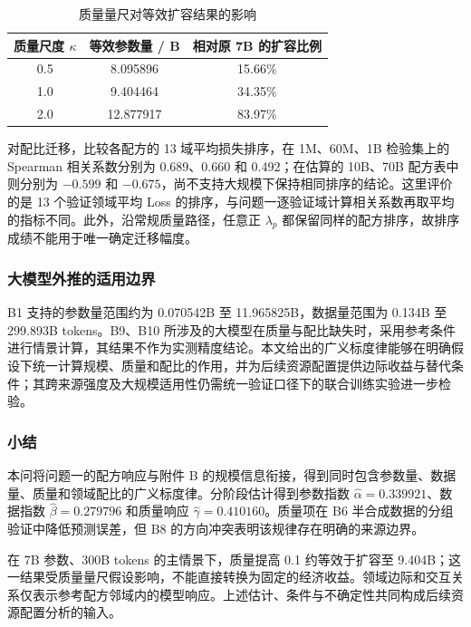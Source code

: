 \documentclass[bwprint]{gmcmthesis}
\numberwithin{equation}{section}
\numberwithin{figure}{section}
\numberwithin{table}{section}
\begin{document}
        \begin{table}[H]
         \centering
         \caption{质量量尺对等效扩容结果的影响}
         \label{tab:p2_sensitivity}
         \begin{tabular}{ccc}
          \toprule
          质量尺度 $\kappa$ & 等效参数量 / B & 相对原 7B 的扩容比例 \\
          \midrule
          0.5 & 8.095896 & 15.66\% \\
          1.0 & 9.404464 & 34.35\% \\
          2.0 & 12.877917 & 83.97\% \\
          \bottomrule
         \end{tabular}
        \end{table}
        
        对配比迁移，比较各配方的 13 域平均损失排序，在 1M、60M、1B 检验集上的 Spearman 相关系数分别为 0.689、0.660 和 0.492；在估算的 10B、70B 配方表中则分别为 $-0.599$ 和 $-0.675$，尚不支持大规模下保持相同排序的结论。这里评价的是 13 个验证领域平均 Loss 的排序，与问题一逐验证域计算相关系数再取平均的指标不同。此外，沿常规质量路径，任意正 $\lambda_p$ 都保留同样的配方排序，故排序成绩不能用于唯一确定迁移幅度。

        \subsubsection{大模型外推的适用边界}  %
        B1 支持的参数量范围约为 0.070542B 至 11.965825B，数据量范围为 0.134B 至 299.893B tokens。B9、B10 所涉及的大模型在质量与配比缺失时，采用参考条件进行情景计算，其结果不作为实测精度结论。本文给出的广义标度律能够在明确假设下统一计算规模、质量和配比的作用，并为后续资源配置提供边际收益与替代条件；其跨来源强度及大规模适用性仍需统一验证口径下的联合训练实验进一步检验。

        \subsubsection{小结}  %
        本问将问题一的配方响应与附件 B 的规模信息衔接，得到同时包含参数量、数据量、质量和领域配比的广义标度律。分阶段估计得到参数指数 $\widehat\alpha=0.339921$、数据指数 $\widehat\beta=0.279796$ 和质量响应 $\widehat\gamma=0.410160$。质量项在 B6 半合成数据的分组验证中降低预测误差，但 B8 的方向冲突表明该规律存在明确的来源边界。

        在 7B 参数、300B tokens 的主情景下，质量提高 0.1 约等效于扩容至 9.404B；这一结果受质量量尺假设影响，不能直接转换为固定的经济收益。领域边际和交互关系仅表示参考配方邻域内的模型响应。上述估计、条件与不确定性共同构成后续资源配置分析的输入。
        
\end{document}
